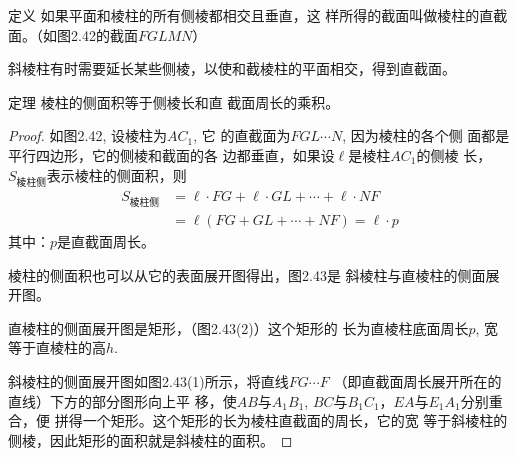 \begin{blk}{定义}
    如果平面和棱柱的所有侧棱都相交且垂直，这
样所得的截面叫做棱柱的直截面。（如图2.42的截面$FGLM
N$）
\end{blk}

\begin{figure}[htp]
    \centering
{}
    \caption{}
\end{figure}


斜棱柱有时需要延长某些侧棱，以使和截棱柱的平面相交，得到直截面。

\begin{blk}{定理}
    棱柱的侧面积等于侧棱长和直
截面周长的乘积。
\end{blk}

\begin{proof}
如图2.42, 设棱柱为$AC_1$, 它
的直截面为$FGL\cdots N$, 因为棱柱的各个侧
面都是平行四边形，它的侧棱和截面的各
边都垂直，如果设$\ell$是棱柱$AC_1$的侧棱
长，$S_{\text{棱柱侧}}$表示棱柱的侧面积，则
\[\begin{split}
    S_{\text{棱柱侧}}&=\ell\cdot FG+\ell\cdot GL+\cdots+\ell\cdot NF\\
    &=\ell(FG+GL+\cdots+NF)=\ell\cdot p
\end{split}\]
其中：$p$是直截面周长。

棱柱的侧面积也可以从它的表面展开图得出，图2.43是
斜棱柱与直棱柱的侧面展开图。

直棱柱的侧面展开图是矩形，（图2.43(2)）这个矩形的
长为直棱柱底面周长$p$, 宽等于直棱柱的高$h$. 

斜棱柱的侧面展开图如图2.43(1)所示，将直线$FG\cdots F$
（即直截面周长展开所在的直线）下方的部分图形向上平
移，使$AB$与$A_1B_1$, $BC$与$B_1C_1$，$EA$与$E_1A_1$分别重合，便
拼得一个矩形。这个矩形的长为棱柱直截面的周长，它的宽
等于斜棱柱的侧棱，因此矩形的面积就是斜棱柱的面积。
\end{proof}

